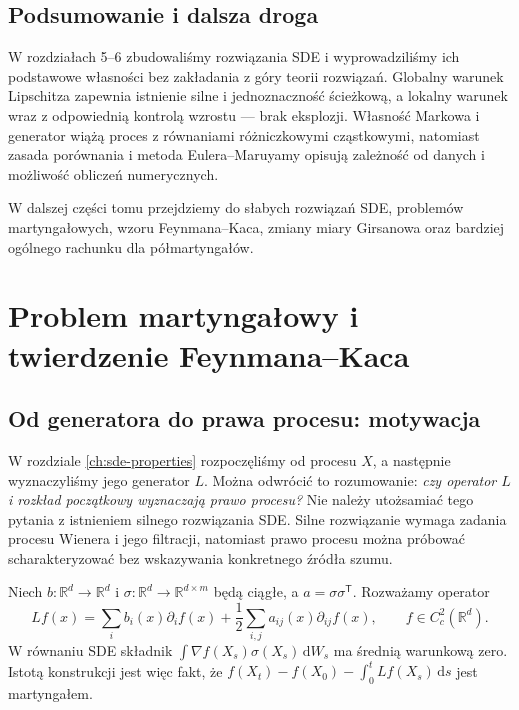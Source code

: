 \documentclass[11pt,a4paper,oneside]{report}
\numberwithin{equation}{chapter}
\theoremstyle{plain}
\theoremstyle{definition}
\theoremstyle{remark}
\newcommand{\R}{\mathbb{R}}
\newcommand{\dd}{\mathrm{d}}
\begin{document}
\section{Podsumowanie i dalsza droga}
W rozdziałach 5--6 zbudowaliśmy rozwiązania SDE i
wyprowadziliśmy ich podstawowe własności bez
zakładania z góry teorii rozwiązań. Globalny warunek
Lipschitza zapewnia istnienie silne i jednoznaczność
ścieżkową, a lokalny warunek wraz z odpowiednią
kontrolą wzrostu — brak eksplozji. Własność Markowa
i generator wiążą proces z równaniami różniczkowymi
cząstkowymi, natomiast zasada porównania i metoda
Eulera--Maruyamy opisują zależność od danych i
możliwość obliczeń numerycznych.

W dalszej części tomu przejdziemy do słabych
rozwiązań SDE, problemów martyngałowych, wzoru
Feynmana--Kaca, zmiany miary Girsanowa oraz
bardziej ogólnego rachunku dla półmartyngałów.

\chapter{Problem martyngałowy i twierdzenie Feynmana--Kaca}
\label{ch:martingale-fk}

\section{Od generatora do prawa procesu: motywacja}

W rozdziale \ref{ch:sde-properties} rozpoczęliśmy od procesu $X$, a następnie
wyznaczyliśmy jego generator $L$. Można odwrócić to rozumowanie:
\emph{czy operator $L$ i rozkład początkowy wyznaczają prawo procesu?}
Nie należy utożsamiać tego pytania z istnieniem silnego rozwiązania SDE.
Silne rozwiązanie wymaga zadania procesu Wienera i jego filtracji,
natomiast prawo procesu można próbować scharakteryzować bez wskazywania
konkretnego źródła szumu.

Niech $b:\R^d\to\R^d$ i $\sigma:\R^d\to\R^{d\times m}$ będą
ciągłe, a $a=\sigma\sigma^{\mathsf T}$. Rozważamy operator
\[
Lf(x)=\sum_i b_i(x)\partial_i f(x)
 +\frac12\sum_{i,j}a_{ij}(x)\partial_{ij}f(x),
 \qquad f\in C_c^2(\R^d).
\]
W równaniu SDE składnik $\int\nabla f(X_s)\sigma(X_s)\,\dd W_s$
ma średnią warunkową zero. Istotą konstrukcji jest więc fakt, że
$f(X_t)-f(X_0)-\int_0^tLf(X_s)\,\dd s$ jest martyngałem.
\end{document}
